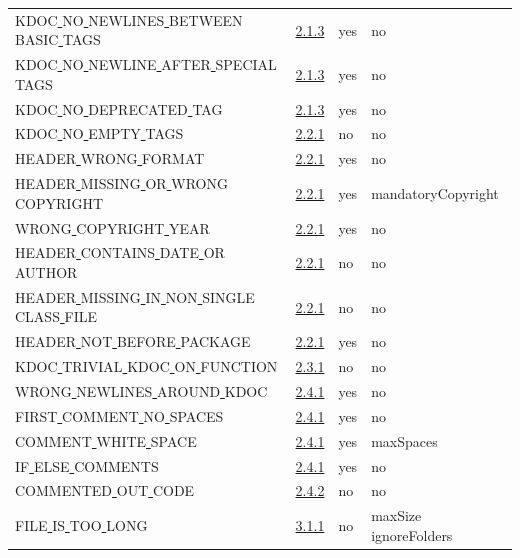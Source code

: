 \begin{longtable}{ |l|p{0.8cm}|p{0.8cm}| p{3cm} | }
KDOC\underline{ }NO\underline{ }NEWLINES\underline{ }BETWEEN\underline{ }BASIC\underline{ }TAGS & \hyperref[sec:2.1.3]{2.1.3} &  yes  &   no  \\
KDOC\underline{ }NO\underline{ }NEWLINE\underline{ }AFTER\underline{ }SPECIAL\underline{ }TAGS & \hyperref[sec:2.1.3]{2.1.3} &  yes  &   no  \\
KDOC\underline{ }NO\underline{ }DEPRECATED\underline{ }TAG & \hyperref[sec:2.1.3]{2.1.3} &  yes  &   no  \\
KDOC\underline{ }NO\underline{ }EMPTY\underline{ }TAGS & \hyperref[sec:2.2.1]{2.2.1} &  no  &   no  \\
HEADER\underline{ }WRONG\underline{ }FORMAT & \hyperref[sec:2.2.1]{2.2.1} &  yes  &   no  \\
HEADER\underline{ }MISSING\underline{ }OR\underline{ }WRONG\underline{ }COPYRIGHT & \hyperref[sec:2.2.1]{2.2.1} &  yes  &  mandatoryCopyright \\
WRONG\underline{ }COPYRIGHT\underline{ }YEAR & \hyperref[sec:2.2.1]{2.2.1} &  yes  &   no  \\
HEADER\underline{ }CONTAINS\underline{ }DATE\underline{ }OR\underline{ }AUTHOR & \hyperref[sec:2.2.1]{2.2.1} &  no  &   no  \\
HEADER\underline{ }MISSING\underline{ }IN\underline{ }NON\underline{ }SINGLE\underline{ }CLASS\underline{ }FILE & \hyperref[sec:2.2.1]{2.2.1} &  no  &   no  \\
HEADER\underline{ }NOT\underline{ }BEFORE\underline{ }PACKAGE & \hyperref[sec:2.2.1]{2.2.1} &  yes  &   no  \\
KDOC\underline{ }TRIVIAL\underline{ }KDOC\underline{ }ON\underline{ }FUNCTION & \hyperref[sec:2.3.1]{2.3.1} &  no  &   no  \\
WRONG\underline{ }NEWLINES\underline{ }AROUND\underline{ }KDOC & \hyperref[sec:2.4.1]{2.4.1} &  yes  &   no  \\
FIRST\underline{ }COMMENT\underline{ }NO\underline{ }SPACES & \hyperref[sec:2.4.1]{2.4.1} &  yes  &   no  \\
COMMENT\underline{ }WHITE\underline{ }SPACE & \hyperref[sec:2.4.1]{2.4.1} &  yes  &   maxSpaces  \\
IF\underline{ }ELSE\underline{ }COMMENTS & \hyperref[sec:2.4.1]{2.4.1} &  yes  &   no  \\
COMMENTED\underline{ }OUT\underline{ }CODE & \hyperref[sec:2.4.2]{2.4.2} &  no  &   no  \\
FILE\underline{ }IS\underline{ }TOO\underline{ }LONG & \hyperref[sec:3.1.1]{3.1.1} &  no  &   maxSize  ignoreFolders  \\

\end{longtable}
